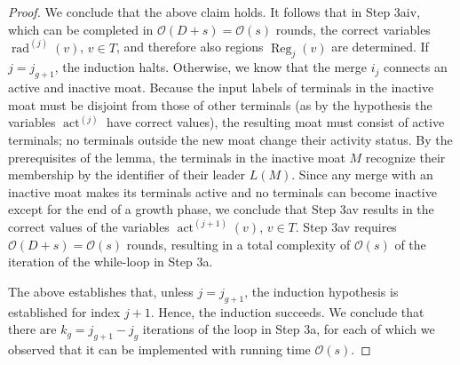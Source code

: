 \documentclass[letterpaper,11pt]{article}
\newcommand{\BO}{\mathcal{O}}
\DeclareMathOperator{\act}{act}
\DeclareMathOperator{\moat}{rad}
\DeclareMathOperator{\reg}{Reg}
\begin{document}
\begin{proof}
We conclude that the above claim holds. It follows that in Step 3aiv, which can
be completed in $\BO(D+s)=\BO(s)$ rounds, the correct variables
$\moat^{(j)}(v)$, $v\in T$, and therefore also regions $\reg_j(v)$ are
determined. If $j=j_{g+1}$, the induction halts. Otherwise, we know that the
merge $i_j$ connects an active and inactive moat. Because the input labels of
terminals in the inactive moat must be disjoint from those of other terminals
(as by the hypothesis the variables $\act^{(j)}$ have correct values), the resulting
moat must consist of active terminals; no terminals outside the new moat change
their activity status. By the prerequisites of the lemma, the terminals in the
inactive moat $M$ recognize their membership by the identifier of their leader
$L(M)$. Since any merge with an inactive moat makes its terminals active and no
terminals can become inactive except for the end of a growth phase, we conclude
that Step 3av results in the correct values of the variables $\act^{(j+1)}(v)$,
$v\in T$. Step 3av requires $\BO(D+s)=\BO(s)$ rounds, resulting in a total
complexity of $\BO(s)$ of the iteration of the while-loop in Step 3a.

The above establishes that, unless $j=j_{g+1}$, the induction hypothesis is
established for index $j+1$. Hence, the induction succeeds. We conclude that
there are $k_g=j_{g+1}-j_g$ iterations of the loop in Step 3a, for each of which
we observed that it can be implemented with running time $\BO(s)$.
\end{proof}
\end{document}

